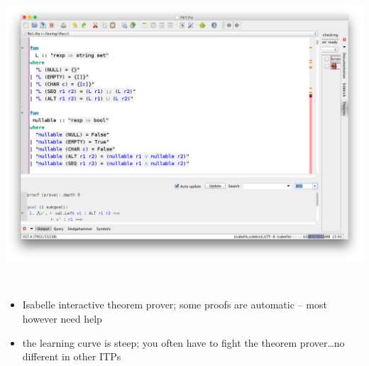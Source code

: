 \documentclass[dvipsnames,14pt,t]{beamer}
\begin{document}

  \begin{frame}[c]

  \begin{center}
  \includegraphics[scale=0.2]{pics/isabelle.png}
  \end{center}
  \mbox{}\\[-20mm]\mbox{}

  \begin{itemize}
  \item Isabelle interactive theorem prover; 
  some proofs are automatic -- most however need help
  \item the learning curve is steep; you often have to fight the 
  theorem prover\ldots no different in other ITPs
  \end{itemize}

  \end{frame}
\end{document}
